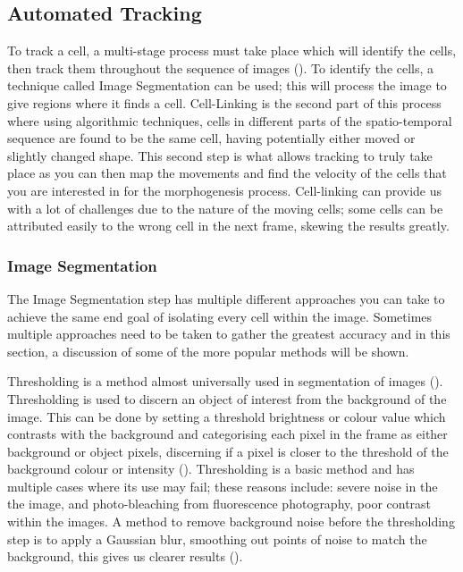 \documentclass[12pt a4paper]{article}
\begin{document}
    \subsection{Automated Tracking}
    To track a cell, a multi-stage process must take place which will identify the cells, then track them throughout the sequence of images (\cite{MEIJERING2012183}). To identify the cells, a technique called Image Segmentation can be used; this will process the image to give regions where it finds a cell. Cell-Linking is the second part of this process where using algorithmic techniques, cells in different parts of the spatio-temporal sequence are found to be the same cell, having potentially either moved or slightly changed shape. This second step is what allows tracking to truly take place as you can then map the movements and find the velocity of the cells that you are interested in for the morphogenesis process. Cell-linking can provide us with a lot of challenges due to the nature of the moving cells; some cells can be attributed easily to the wrong cell in the next frame, skewing the results greatly.
        \subsubsection{Image Segmentation}
        The Image Segmentation step has multiple different approaches you can take to achieve the same end goal of isolating every cell within the image. Sometimes multiple approaches need to be taken to gather the greatest accuracy and in this section, a discussion of some of the more popular methods will be shown.
        
        Thresholding is a method almost universally used in segmentation of images (\cite{miura_2005}). Thresholding is used to discern an object of interest from the background of the image. This can be done by setting a threshold brightness or colour value which contrasts with the background and categorising each pixel in the frame as either background or object pixels, discerning if a pixel is closer to the threshold of the background colour or intensity (\cite{MEIJERING2012183}). Thresholding is a basic method and has multiple cases where its use may fail; these reasons include: severe noise in the the image, and photo-bleaching from fluorescence photography, poor contrast within the images. A method to remove background noise before the thresholding step is to apply a Gaussian blur, smoothing out points of noise to match the background, this gives us clearer results (\cite{opencv}).
        
\end{document}
